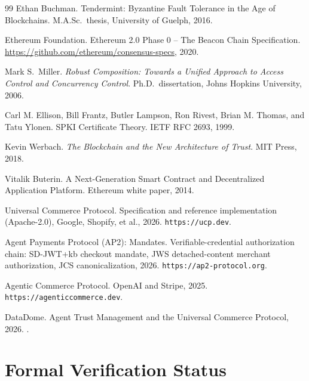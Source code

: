 \documentclass[11pt,a4paper]{article}
\theoremstyle{definition}
\theoremstyle{remark}
\begin{document}
\begin{thebibliography}{99}
Ethan Buchman.
\newblock Tendermint: Byzantine Fault Tolerance in the Age of Blockchains.
\newblock M.A.Sc.\ thesis, University of Guelph, 2016.

Ethereum Foundation.
\newblock Ethereum 2.0 Phase 0 -- The Beacon Chain Specification.
\newblock \url{https://github.com/ethereum/consensus-specs}, 2020.

Mark S.\ Miller.
\newblock \textit{Robust Composition: Towards a Unified Approach to Access Control and Concurrency Control}.
\newblock Ph.D.\ dissertation, Johns Hopkins University, 2006.

Carl M. Ellison, Bill Frantz, Butler Lampson, Ron Rivest, Brian M. Thomas, and Tatu Ylonen.
\newblock SPKI Certificate Theory.
\newblock IETF RFC 2693, 1999.

Kevin Werbach.
\newblock \textit{The Blockchain and the New Architecture of Trust}.
\newblock MIT Press, 2018.

Vitalik Buterin.
\newblock A Next-Generation Smart Contract and Decentralized Application Platform.
\newblock Ethereum white paper, 2014.

Universal Commerce Protocol.
\newblock Specification and reference implementation (Apache-2.0), Google, Shopify, et al., 2026.
\newblock \texttt{https://ucp.dev}.

Agent Payments Protocol (AP2): Mandates.
\newblock Verifiable-credential authorization chain: SD-JWT+kb checkout mandate, JWS detached-content merchant authorization, JCS canonicalization, 2026.
\newblock \texttt{https://ap2-protocol.org}.

Agentic Commerce Protocol.
\newblock OpenAI and Stripe, 2025.
\newblock \texttt{https://agenticcommerce.dev}.

DataDome.
\newblock Agent Trust Management and the Universal Commerce Protocol, 2026.
\newblock {}.

\end{thebibliography}

\appendix

\section{Formal Verification Status}\label{app:mech}
\end{document}
